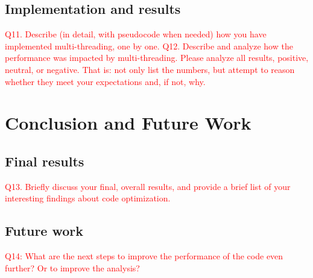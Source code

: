 \documentclass[11pt]{article}
\newcommand \question[1]{\textcolor{red}{#1}}
\begin{document}
\subsection{Implementation and results}

\question{Q11. Describe (in detail, with pseudocode when needed) how you have implemented multi-threading, one by one.}
\question{Q12. Describe and analyze how the performance was impacted by multi-threading. Please analyze all results, positive, neutral, or negative. That is: not only list the numbers, but attempt to reason whether they meet your expectations and, if not, why.}

\section{Conclusion and Future Work} 

\subsection{Final results}
\question{Q13. Briefly discuss your final, overall results, and provide a brief list of your interesting findings about code optimization. }

\subsection*{Future work}
\question{Q14: What are the next steps to improve the performance of the code even further? Or to improve the analysis? }

\appendix



%
% 
\end{document}
